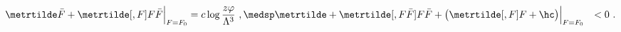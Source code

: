 \begin{equation}
\label{eq:Fpotconstr}
\begin{split}
  \Bigl. \metrtilde \bar{F} + \metrtilde[, F] F \bar{F}\Bigr|_{F = F_0} &= c
  \log \frac{z \varphi}{\Lambda^3}\ , \medsp
  \Bigl. \metrtilde + \metrtilde[, F \bar{F}] F \bar{F} + \bigl( \metrtilde[, F] F +
  \hc \bigr)\Bigr|_{F = F_0} &< 0\ .
\end{split}
\end{equation}

